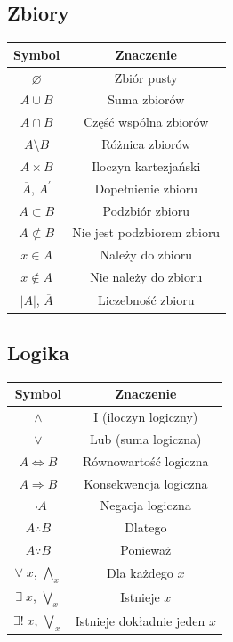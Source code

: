 \documentclass[14pt,a4paper]{extarticle}
\begin{document}
\begin{multicols}{2}
\subsection{Zbiory}

\begin{tabular}{*{2}{|c}|}
\hline
Symbol & Znaczenie \\
\hline
$\varnothing $ & Zbiór pusty \\
$A\cup B$ & Suma zbiorów \\
$A\cap B$ & Część wspólna zbiorów \\
$A\setminus B$ & Różnica zbiorów \\
$A\times B$ & Iloczyn kartezjański \\
$\overline{A}$, $A^\prime$ & Dopełnienie zbioru \\
$A\subset B$ & Podzbiór zbioru \\
$A\not\subset B$ & Nie jest podzbiorem zbioru \\
$x\in A$ & Należy do zbioru \\
$x\not\in A$ & Nie należy do zbioru \\
$\vert A\vert $, $\overline{\overline{A}}$ & Liczebność zbioru \\
\hline
\end{tabular}

\subsection{Logika}

\begin{tabular}{*{2}{|c}|}
\hline
Symbol & Znaczenie \\
\hline
$\land$ & I (iloczyn logiczny)\\
$\lor$ & Lub (suma logiczna) \\
$A\Leftrightarrow B$ & Równowartość logiczna \\
$A\Rightarrow B$ & Konsekwencja logiczna \\
$\lnot A$ & Negacja logiczna \\
$A\therefore B$ & Dlatego \\
$A\because B$ & Ponieważ \\
$\forall \;x$, $\underset{x}{\bigwedge}$ & Dla każdego $x$ \\
$\exists \;x$, $\underset{x}{\bigvee}$ & Istnieje $x$ \\
$\exists! \;x$, $\underset{x}{\dot\bigvee}$ & Istnieje dokładnie jeden $x$ \\
\hline
\end{tabular}

\end{multicols}
\newpage
\renewcommand{\arraystretch}{1.2}
\setlength{\arrayrulewidth}{0.5mm}
\end{document}
